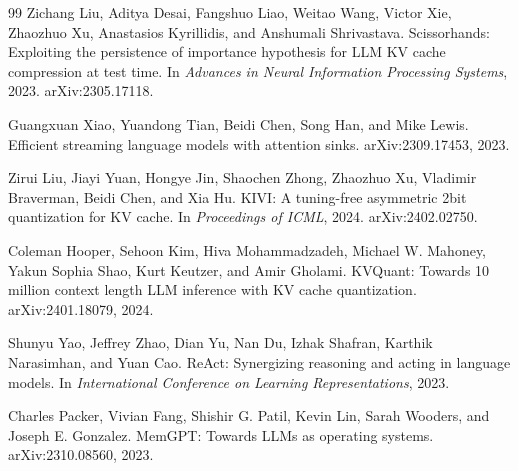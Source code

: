 \documentclass[11pt]{article}
\begin{document}
\begin{thebibliography}{99}
Zichang Liu, Aditya Desai, Fangshuo Liao, Weitao Wang, Victor Xie, Zhaozhuo
Xu, Anastasios Kyrillidis, and Anshumali Shrivastava.
\newblock Scissorhands: Exploiting the persistence of importance hypothesis
for LLM KV cache compression at test time.
\newblock In \emph{Advances in Neural Information Processing Systems}, 2023.
\newblock arXiv:2305.17118.

Guangxuan Xiao, Yuandong Tian, Beidi Chen, Song Han, and Mike Lewis.
\newblock Efficient streaming language models with attention sinks.
\newblock arXiv:2309.17453, 2023.

Zirui Liu, Jiayi Yuan, Hongye Jin, Shaochen Zhong, Zhaozhuo Xu, Vladimir
Braverman, Beidi Chen, and Xia Hu.
\newblock KIVI: A tuning-free asymmetric 2bit quantization for KV cache.
\newblock In \emph{Proceedings of ICML}, 2024.
\newblock arXiv:2402.02750.

Coleman Hooper, Sehoon Kim, Hiva Mohammadzadeh, Michael W. Mahoney, Yakun Sophia
Shao, Kurt Keutzer, and Amir Gholami.
\newblock KVQuant: Towards 10 million context length LLM inference with KV
cache quantization.
\newblock arXiv:2401.18079, 2024.

Shunyu Yao, Jeffrey Zhao, Dian Yu, Nan Du, Izhak Shafran, Karthik Narasimhan,
and Yuan Cao.
\newblock ReAct: Synergizing reasoning and acting in language models.
\newblock In \emph{International Conference on Learning Representations}, 2023.

Charles Packer, Vivian Fang, Shishir G. Patil, Kevin Lin, Sarah Wooders, and
Joseph E. Gonzalez.
\newblock MemGPT: Towards LLMs as operating systems.
\newblock arXiv:2310.08560, 2023.

\end{thebibliography}
\end{document}
